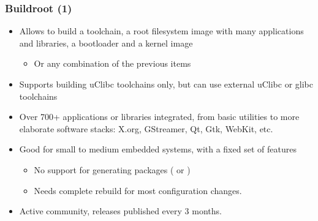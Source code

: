 \begin{frame}
  \frametitle{Buildroot (1)}
  \begin{itemize}
  \item Allows to build a toolchain, a root filesystem image with many
    applications and libraries, a bootloader and a kernel image
    \begin{itemize}
    \item Or any combination of the previous items
    \end{itemize}
  \item Supports building uClibc toolchains only, but can use external
    uClibc or glibc toolchains
  \item Over 700+ applications or libraries integrated, from basic
    utilities to more elaborate software stacks: X.org, GStreamer, Qt,
    Gtk, WebKit, etc.
  \item Good for small to medium embedded systems, with a fixed set of
    features
    \begin{itemize}
    \item No support for generating packages ( or
      )
    \item Needs complete rebuild for most configuration changes.
    \end{itemize}
  \item Active community, releases published every 3 months.
  \end{itemize}
\end{frame}

